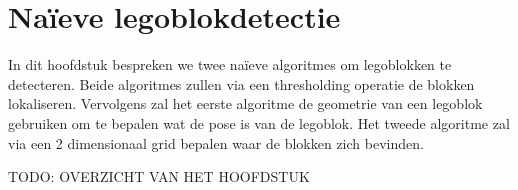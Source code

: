 \chapter{Na\"ieve legoblokdetectie}
\label{hoofdstuk:2}
In dit hoofdstuk bespreken we twee na\"ieve algoritmes om legoblokken te detecteren. Beide algoritmes zullen via een thresholding operatie de blokken lokaliseren. Vervolgens zal het eerste algoritme de geometrie van een legoblok gebruiken om te bepalen wat de pose is van de legoblok. Het tweede algoritme zal via een 2 dimensionaal grid bepalen waar de blokken zich bevinden.

TODO: OVERZICHT VAN HET HOOFDSTUK

%
%
%
%
%

